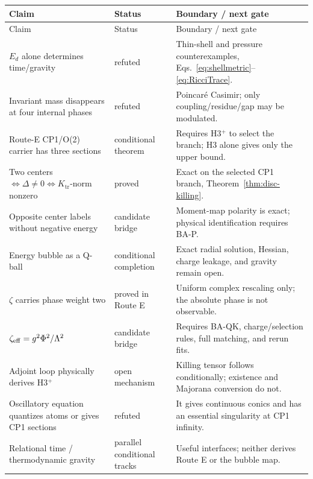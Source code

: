 \documentclass[11pt]{article}
\numberwithin{equation}{section}
\newcommand{\Ktr}{K_{\mathrm{tr}}}
\newcommand{\status}[1]{\textsf{#1}}
\begin{document}
\begin{longtable}{>{\raggedright\arraybackslash}p{}
                  >{\raggedright\arraybackslash}p{}
                  >{\raggedright\arraybackslash}p{}}
\toprule
Claim & Status & Boundary / next gate \\
\midrule
\endfirsthead
\toprule
Claim & Status & Boundary / next gate \\
\midrule
\endhead
\(E_d\) alone determines time/gravity & \status{refuted} & Thin-shell and
pressure counterexamples, Eqs.~\eqref{eq:shellmetric}--\eqref{eq:RicciTrace}.\\
Invariant mass disappears at four internal phases & \status{refuted} &
Poincar\'e Casimir; only coupling/residue/gap may be modulated.\\
Route-E CP1/O(2) carrier has three sections & \status{conditional theorem} &
Requires H3$^+$ to select the branch; H3 alone gives only the upper bound.\\
Two centers \(\Leftrightarrow\Delta\ne0\Leftrightarrow\Ktr\)-norm nonzero &
\status{proved} & Exact on the selected CP1 branch,
Theorem~\ref{thm:disc-killing}.\\
Opposite center labels without negative energy & \status{candidate bridge} &
Moment-map polarity is exact; physical identification requires BA-P.\\
Energy bubble as a Q-ball & \status{conditional completion} & Exact radial
solution, Hessian, charge leakage, and gravity remain open.\\
\(\zeta\) carries phase weight two & \status{proved in Route E} & Uniform
complex rescaling only; the absolute phase is not observable.\\
\(\zeta_{\rm eff}=g^2\Phi^2/\Lambda^2\) & \status{candidate bridge} &
Requires BA-QK, charge/selection rules, full matching, and rerun fits.\\
Adjoint loop physically derives H3$^+$ & \status{open mechanism} & Killing
tensor follows conditionally; existence and Majorana conversion do not.\\
Oscillatory equation quantizes atoms or gives CP1 sections & \status{refuted} &
It gives continuous conics and has an essential singularity at CP1 infinity.\\
Relational time / thermodynamic gravity & \status{parallel conditional tracks} &
Useful interfaces; neither derives Route E or the bubble map.\\
\bottomrule
\end{longtable}
\end{document}
